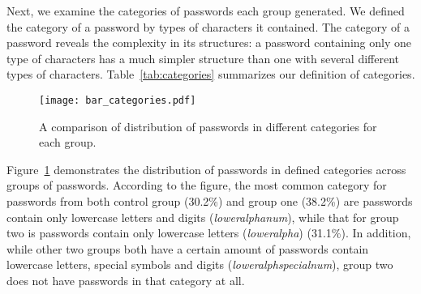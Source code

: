\documentclass[conference]{IEEEtran}
\begin{document}
Next, we examine the categories of passwords each group generated. We defined the category of a password by types of characters it contained. The category of a password reveals the complexity in its structures: a password containing only one type of characters has a much simpler structure than one with several different types of characters. Table~\ref{tab:categories} summarizes our definition of categories.



\begin{table}
\begin{center}
  \caption{Definition of each category of passwords. All types with very low occurrence in our passwords were aggregated into ``others" category.}
    \label{tab:categories}
\end{center}
\end{table}

\begin{figure}[!Htbp]
\texttt{[image: bar\_categories.pdf]}
\caption{\label{fig:bar_categories} A comparison of distribution of passwords in different categories for each group.}
\vspace{-9pt}
\end{figure}

Figure~\ref{fig:bar_categories} demonstrates the distribution of passwords in defined categories across groups of passwords. According to the figure, the most common category for passwords from both control group (30.2\%) and group one (38.2\%) are passwords contain only lowercase letters and digits (\emph{loweralphanum}), while that for group two is passwords contain only lowercase letters (\emph{loweralpha}) (31.1\%). In addition, while other two groups both have a certain amount of passwords contain lowercase letters, special symbols and digits (\emph{loweralphspecialnum}), group two does not have passwords in that category at all.
\end{document}
